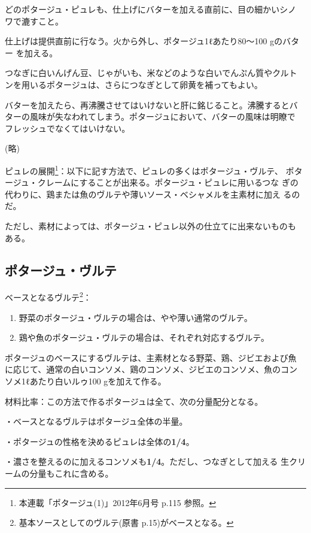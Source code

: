 どのポタージュ・ピュレも、仕上げにバターを加える直前に、目の細かいシノ
ワで漉すこと。

仕上げは提供直前に行なう。火から外し、ポタージュ1ℓあたり80〜100
gのバター を加える。

つなぎに白いんげん豆、じゃがいも、米などのような白いでんぷん質やクルト
ンを用いるポタージュは、さらにつなぎとして卵黄を補ってもよい。

バターを加えたら、再沸騰させてはいけないと肝に銘じること。沸騰するとバ
ターの風味が失なわれてしまう。ポタージュにおいて、バターの風味は明瞭で
フレッシュでなくてはいけない。

(略)

ピュレの展開\footnote{本連載「ポタージュ(1)」2012年6月号 p.115 参照。}：以下に記す方法で、ピュレの多くはポタージュ・ヴルテ、
ポタージュ・クレームにすることが出来る。ポタージュ・ピュレに用いるつな
ぎの代わりに、鶏または魚のヴルテや薄いソース・ベシャメルを主素材に加え
るのだ。

ただし、素材によっては、ポタージュ・ピュレ以外の仕立てに出来ないものも
ある。

\hypertarget{ux30ddux30bfux30fcux30b8ux30e5ux30f4ux30ebux30c6}{%
\subsection{ポタージュ・ヴルテ}\label{ux30ddux30bfux30fcux30b8ux30e5ux30f4ux30ebux30c6}}


ベースとなるヴルテ\footnote{基本ソースとしてのヴルテ(原書
  p.15)がベースとなる。}：

\begin{enumerate}
\def\labelenumi{\arabic{enumi}.}
\item
  野菜のポタージュ・ヴルテの場合は、やや薄い通常のヴルテ。
\item
  鶏や魚のポタージュ・ヴルテの場合は、それぞれ対応するヴルテ。
\end{enumerate}

ポタージュのベースにするヴルテは、主素材となる野菜、鶏、ジビエおよび魚
に応じて、通常の白いコンソメ、鶏のコンソメ、ジビエのコンソメ、魚のコン
ソメ1ℓあたり白いルゥ100 gを加えて作る。

材料比率：この方法で作るポタージュは全て、次の分量配分となる。

・ベースとなるヴルテはポタージュ全体の半量。

・ポタージュの性格を決めるピュレは全体の\textbf{1/4}。

・濃さを整えるのに加えるコンソメも\textbf{1/4}。ただし、つなぎとして加える
生クリームの分量もこれに含める。

